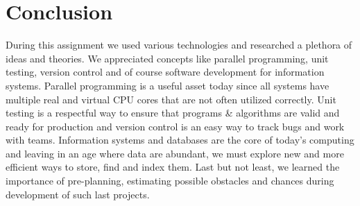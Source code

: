 \documentclass{ws-ijprai}
\begin{document}
\section{Conclusion}

\tab During this assignment we used various technologies and researched a plethora of ideas and theories. We appreciated concepts like parallel programming, unit testing, version control and of course software development for information systems. Parallel programming is a useful asset today since all systems have multiple real and virtual CPU cores that are not often utilized correctly. Unit testing is a respectful way to ensure that programs \& algorithms are valid and ready for production and version control is an easy way to track bugs and work with teams. Information systems and databases are the core of today's computing and leaving in an age where data are abundant, we must explore new and more efficient ways to store, find and index them. Last but not least, we learned the importance of pre-planning, estimating possible obstacles and chances during development of such last projects.
\clearpage
\end{document}
